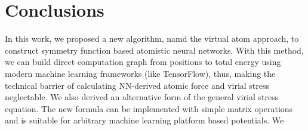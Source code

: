 \documentclass[prb,preprint]{revtex4-2}
\begin{document}
% 
%
\section{Conclusions}
\label{section:conclusions}

In this work, we proposed a new algorithm, namd the virtual atom approach, 
to construct symmetry function based atomistic neural networks. With this 
method, we can build direct computation graph from positions to total energy 
using modern machine learning frameworks (like TensorFlow), thus, making the 
technical barrier of calculating NN-derived atomic force and virial stress  
neglectable. We also derived an alternative form of the general virial stress 
equation. The new formula can be implemented with simple matrix operations and 
is suitable for arbitrary machine learning platform based potentials. We 
\end{document}
